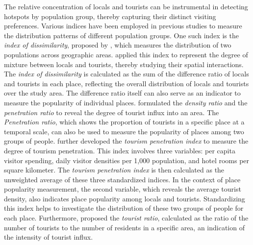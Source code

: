 \documentclass{article}
\theoremstyle{remark}
\begin{document}
The relative concentration of locals and tourists can be instrumental in detecting hotspots by population group, thereby capturing their distinct visiting preferences. Various indices have been employed in previous studies to measure the distribution patterns of different population groups. One such index is the \textit{index of dissimilarity}, proposed by \cite{sakoda_generalized_1981}, which measures the distribution of two populations across geographic areas. \cite{li_analyzing_2018} applied this index to represent the degree of mixture between locals and tourists, thereby studying their spatial interactions. The \textit{index of dissimilarity} is calculated as the sum of the difference ratio of locals and tourists in each place, reflecting the overall distribution of locals and tourists over the study area. The difference ratio itself can also serve as an indicator to measure the popularity of individual places. \cite{mcelroy_applying_1993} formulated the \textit{density ratio} and the \textit{penetration ratio} to reveal the degree of tourist influx into an area. The \textit{Penetration ratio}, which shows the proportion of tourists in a specific place at a temporal scale, can also be used to measure the popularity of places among two groups of people. \cite{mcelroy_tourism_1998} further developed the \textit{tourism penetration index} to measure the degree of tourism penetration. This index involves three variables: per capita visitor spending, daily visitor densities per 1,000 population, and hotel rooms per square kilometer. The \textit{tourism penetration index} is then calculated as the unweighted average of these three standardized indices. In the context of place popularity measurement, the second variable, which reveals the average tourist density, also indicates place popularity among locals and tourists. Standardizing this index helps to investigate the distribution of these two groups of people for each place. Furthermore, \cite{faulkner_framework_1997} proposed the \textit{tourist ratio}, calculated as the ratio of the number of tourists to the number of residents in a specific area, an indication of the intensity of tourist influx. 
\end{document}
